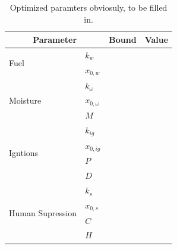 \begin{table}[]
\centering
\caption{Optimized paramters obviosuly, to be filled in.}
\label{tab:optimize}
\begin{tabular}{llll}
\hline
\multicolumn{2}{c}{\textbf{Parameter}} & \multicolumn{1}{c}{\textbf{Bound}} & \multicolumn{1}{c}{\textbf{Value}} \\ \hline
\multirow{2}{*}{Fuel}             & $k_{w}$         &                                    &                                    \\
                                  & $x_{0,w}$       &                                    &                                    \\ \hline
\multirow{3}{*}{Moisture}         & $k_{\omega}$    &                                    &                                    \\
                                  & $x_{0, \omega}$ &                                    &                                    \\
                                  & $M$             &                                    &                                    \\ \hline
\multirow{4}{*}{Igntions}         & $k_{ig}$        &                                    &                                    \\
                                  & $x_{0, ig}$     &                                    &                                    \\
                                  & $P$             &                                    &                                    \\
                                  & $D$             &                                    &                                    \\ \hline
\multirow{4}{*}{Human Supression} & $k_{s}$         &                                    &                                    \\
                                  & $x_{0, s}$      &                                    &                                    \\
                                  & $C$             &                                    &                                    \\
                                  & $H$             &                                    &                                    \\ \hline
\end{tabular}
\end{table}
